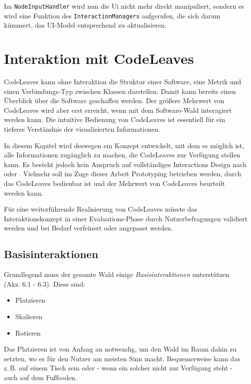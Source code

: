 Im \texttt{NodeInputHandler} wird nun die Ui nicht mehr direkt manipuliert, sondern es wird eine Funktion des \texttt{InteractionManagers} aufgerufen, die sich darum kümmert, das UI-Model entsprechend zu aktualisieren.

\chapter{Interaktion mit CodeLeaves}
\label{ch:interaction}

CodeLeaves kann ohne Interaktion die Struktur einer Software, eine Metrik und einen Verbindungs-Typ zwischen Klassen darstellen. Damit kann bereits einen Überblick über die Software geschaffen werden. Der größere Mehrwert von CodeLeaves wird aber erst erreicht, wenn mit dem Software-Wald interagiert werden kann. Die intuitive Bedienung von CodeLeaves ist essentiell für ein tieferes Verständnis der visualisierten Informationen.

In diesem Kapitel wird deswegen ein Konzept entwickelt, mit dem es möglich ist, alle Informationen zugänglich zu machen, die CodeLeaves zur Verfügung stellen kann. Es besteht jedoch kein Anspruch auf vollständiges Interactions Design nach \cite{goodwin2011designing} oder \cite{cooper2014face}. Vielmehr soll im Zuge dieser Arbeit Prototyping betrieben werden, durch das CodeLeaves bedienbar ist und der Mehrwert von CodeLeaves beurteilt werden kann.

Für eine weiterführende Realisierung von CodeLeaves müsste das Interaktionskonzept in einer Evaluations-Phase durch Nutzerbefragungen validiert werden und bei Bedarf verfeinert oder angepasst werden.

\section{Basisinteraktionen}
Grundlegend muss der gesamte Wald einige \textit{Basisinteraktionen} unterstützen (Akz. 6.1 - 6.3). Diese sind:

\begin{itemize}
  \item Platzieren
  \item Skalieren
  \item Rotieren
\end{itemize}

Das Platzieren ist von Anfang an notwendig, um den Wald im Raum dahin zu setzten, wo es für den Nutzer am meisten Sinn macht. Bequemerweise kann das z.\,B. auf einem Tisch sein oder - wenn ein solcher nicht zur Verfügung steht - auch auf dem Fußboden.

